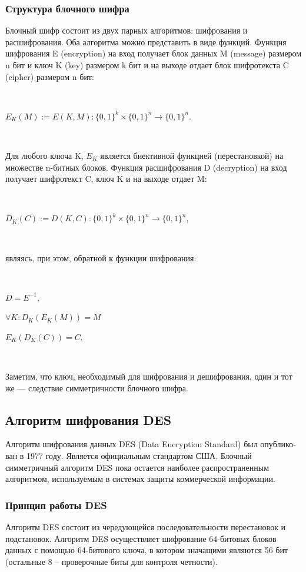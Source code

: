 \documentclass[a4paper]{report}
\begin{document}
\subsubsection{Структура блочного шифра}
Блочный шифр состоит из двух парных алгоритмов: шифрования и расшифрования. Оба алгоритма можно представить в виде функций. Функция шифрования E (encryption) на вход получает блок данных M (message) размером n бит и ключ K (key) размером k бит и на выходе отдает блок шифротекста C (cipher) размером n бит:

~

$E_K(M) := E(K,M) : \{0,1\}^k \times \{0,1\}^n \to \{0,1\}^n$.

~

Для любого ключа K, $E_K$ является биективной функцией (перестановкой) на множестве n-битных блоков. Функция расшифрования D (decryption) на вход получает шифротекст C, ключ K и на выходе отдает M:

~

$D_K(C) := D(K,C) : \{0,1\}^k \times \{0,1\}^n \to \{0,1\}^n$,

~

являясь, при этом, обратной к функции шифрования:

~

$D = E^{-1}$,
\medskip

$\forall K: D_K(E_K(M)) = M$
\medskip

$E_K(D_K(C)) = C$.

~

Заметим, что ключ, необходимый для шифрования и дешифрования, один и тот же — следствие симметричности блочного шифра.

\subsection{Алгоритм шифрования DES}
Алгоритм шифрования данных DES (Data Encryption Standard) был опублико­ван в 1977 году. Является официальным стандартом США. Блочный симметричный алгоритм DES пока остается наиболее распространенным алгоритмом, используемым в системах защиты коммерческой информации.

\subsubsection{Принцип работы DES}
Алгоритм DES состоит из чередующейся последовательности перестановок и подстановок. Алгоритм DES осуществляет шифрование 64-битовых блоков данных с помощью 64-битового ключа, в котором значащими являются 56 бит (остальные 8 – проверочные биты для контроля четности).
\end{document}
